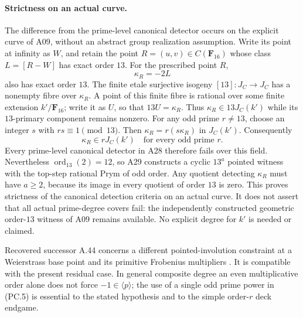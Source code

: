 \paragraph{Strictness on an actual curve.}
The difference from the prime-level canonical detector occurs on
the explicit curve of A09, without an abstract group realization
assumption. Write its point at infinity as $W$, and retain the
point $R=(u,v)\in C(\mathbf F_{16})$ whose class
$L=[R-W]$ has exact order $13$. For the prescribed point $R$,
\[
                   \kappa_R=-2L
 \tag{PC.13}
\]
also has exact order $13$. The finite etale surjective isogeny
$[13]:J_C\to J_C$ has a nonempty fibre over $\kappa_R$.
A point of this finite fibre is rational over some finite
extension $k'/\mathbf F_{16}$; write it as $U$, so that
$13U=\kappa_R$. Thus
$\kappa_R\in13J_C(k')$ while its $13$-primary component remains
nonzero. For any odd prime $r\ne13$, choose an integer $s$ with
$rs\equiv1\pmod{13}$. Then
$\kappa_R=r(s\kappa_R)$ in $J_C(k')$. Consequently
\[
                  \kappa_R\in rJ_C(k')
                    \quad\text{for every odd prime }r.
 \tag{PC.14}
\]
Every prime-level canonical detector in A28 therefore fails over
this field. Nevertheless $\operatorname{ord}_{13}(2)=12$, so
A29 constructs a cyclic $13^a$ pointed witness with the top-step
rational Prym of odd order. Any quotient detecting $\kappa_R$
must have $a\ge2$, because its image in every quotient of order
$13$ is zero. This proves strictness of the canonical detection
criteria on an actual curve. It does not assert that all actual
prime-degree covers fail: the independently constructed geometric
order-$13$ witness of A09 remains available. No explicit degree
for $k'$ is needed or claimed.

Recovered successor A.44 concerns a different pointed-involution
constraint at a Weierstrass base point and its primitive Frobenius
multipliers \cite[A.44]{ASrun}. It is compatible with the present
residual case. In general composite degree an even multiplicative
order alone does not force $-1\in\langle p\rangle$; the use of a
single odd prime power in (PC.5) is essential to the stated
hypothesis and to the simple order-$r$ deck endgame.

